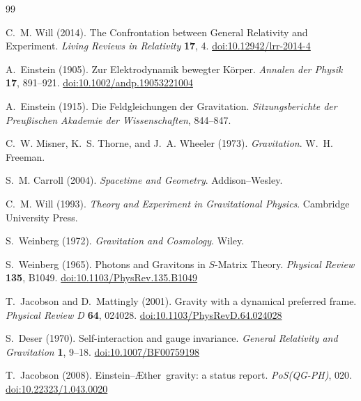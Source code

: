 \documentclass[12pt,a4paper]{article}
\providecommand{\doi}[1]{\href{https://doi.org/#1}{doi:#1}}
\newcommand{\Aether}{\AE ther}
\begin{document}

\begin{thebibliography}{99}

C.~M. Will (2014).
\newblock The Confrontation between General Relativity and Experiment.
\newblock \emph{Living Reviews in Relativity} \textbf{17}, 4.
\newblock \doi{10.12942/lrr-2014-4}

A.~Einstein (1905).
\newblock Zur Elektrodynamik bewegter K\"{o}rper.
\newblock \emph{Annalen der Physik} \textbf{17}, 891--921.
\newblock \doi{10.1002/andp.19053221004}

A.~Einstein (1915).
\newblock Die Feldgleichungen der Gravitation.
\newblock \emph{Sitzungsberichte der Preu\ss{}ischen Akademie der
  Wissenschaften}, 844--847.

C.~W. Misner, K.~S. Thorne, and J.~A. Wheeler (1973).
\newblock \emph{Gravitation}.
\newblock W.~H. Freeman.

S.~M. Carroll (2004).
\newblock \emph{Spacetime and Geometry}.
\newblock Addison--Wesley.

C.~M. Will (1993).
\newblock \emph{Theory and Experiment in Gravitational Physics}.
\newblock Cambridge University Press.

S.~Weinberg (1972).
\newblock \emph{Gravitation and Cosmology}.
\newblock Wiley.

S.~Weinberg (1965).
\newblock Photons and Gravitons in $S$-Matrix Theory.
\newblock \emph{Physical Review} \textbf{135}, B1049.
\newblock \doi{10.1103/PhysRev.135.B1049}

T.~Jacobson and D.~Mattingly (2001).
\newblock Gravity with a dynamical preferred frame.
\newblock \emph{Physical Review D} \textbf{64}, 024028.
\newblock \doi{10.1103/PhysRevD.64.024028}

S.~Deser (1970).
\newblock Self-interaction and gauge invariance.
\newblock \emph{General Relativity and Gravitation} \textbf{1}, 9--18.
\newblock \doi{10.1007/BF00759198}

T.~Jacobson (2008).
\newblock Einstein--\Aether\ gravity: a status report.
\newblock \emph{PoS(QG-PH)}, 020.
\newblock \doi{10.22323/1.043.0020}


\end{thebibliography}
\end{document}
